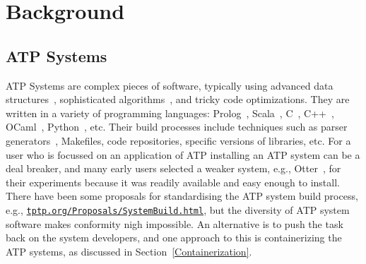 \documentclass{easychair}
\begin{document}
\section{Background}
\label{Background}

\subsection{ATP Systems}
\label{ATPSystems}

ATP Systems are complex pieces of software, typically using advanced data structures~\cite{Sch13}, 
sophisticated algorithms~\cite{Vor01}, and tricky code optimizations\cite{Sch06}.
They are written in a variety of programming languages: Prolog~\cite{Ott23,Hol23}, 
Scala~\cite{SB18}, C~\cite{SCV19}, C++~\cite{RV02-AICOMM}, OCaml~\cite{Kor06}, Python~\cite{SP20}, 
etc.
Their build processes include techniques such as parser generators~\cite{Ste21}, Makefiles,
code repositories, specific versions of libraries, etc.
For a user who is focussed on an application of ATP
installing an ATP system can be a deal breaker, and many early users selected a weaker system, 
e.g., Otter~\cite{McC03-Otter}, for their experiments because it was readily available and easy 
enough to install.
There have been some proposals for standardising the ATP system build process, e.g.,
\href{https://tptp.org/Proposals/SystemBuild.html}{\tt tptp.org/Proposals/SystemBuild.html}, 
but the diversity of ATP system software makes conformity nigh impossible.
An alternative is to push the task back on the system developers, and one approach to this is
containerizing the ATP systems, as discussed in Section~\ref{Containerization}.
\end{document}
